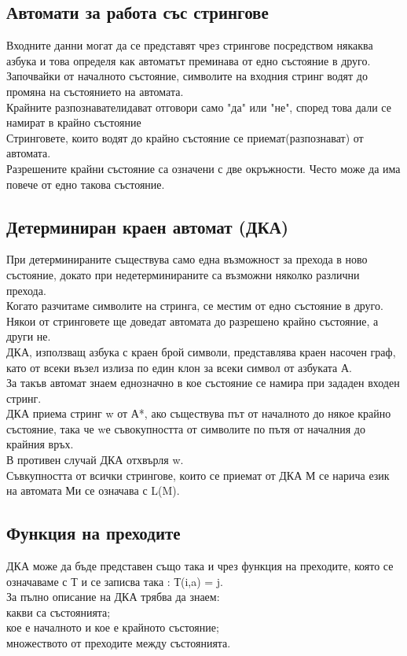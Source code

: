 \documentclass[fleqn, 12pt]{article}
\theoremstyle{definition}
\begin{document}
\subsection{Автомати за работа със стрингове}
Входните данни могат да се представят чрез стрингове посредством някаква азбука и това определя как автоматът преминава от едно състояние в друго.\\
Започвайки от началното състояние, символите на входния стринг водят до промяна на състоянието на автомата.\\
Крайните разпознавателидават отговори само "да" или "не", според това дали се намират в крайно състояние\\
Стринговете, които водят до крайно състояние се приемат(разпознават) от автомата. \\
Разрешените крайни състояние са означени с две окръжности. Често може да  има повече от едно такова състояние.

\subsection{Детерминиран краен автомат (ДКА)}
При детерминираните съществува само една възможност за прехода в ново състояние, докато при недетерминираните са възможни няколко различни прехода. \\
Когато разчитаме символите на стринга, се местим от едно състояние в друго. Някои от стринговете ще доведат автомата до разрешено крайно състояние, а други не.\\
ДКА, използващ азбука с краен брой символи, представлява краен насочен граф, като от всеки възел излиза по един клон за всеки символ от азбуката А.\\
За такъв автомат знаем еднозначно в кое състояние се намира при зададен входен стринг.\\
ДКА  приема  стринг w от А*, ако съществува път от началното до някое крайно състояние, така че wе съвокупността от символите по пътя от началния до крайния връх.\\
В противен случай ДКА отхвърля w. \\
Съвкупността от всички стрингове, които се приемат от ДКА М се нарича език на автомата Ми се означава с L(M).

\subsection{Функция на преходите}
ДКА може да бъде представен също така и чрез функция на преходите, която се означаваме с Т и се записва така : Т(i,a) = j. \\
За пълно описание на ДКА трябва да знаем:\\
какви са състоянията;\\
кое е началното и кое е крайното състояние;\\
множеството от преходите между състоянията.\\
\end{document}
